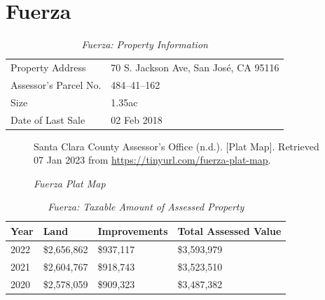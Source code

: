 
\clearpage

\section{Fuerza }\label{sec:fuerza-info}\indent

\begin{table}[htbp]
  \SingleSpacing%
  \caption[Fuerza: Property Information]{\textit{Fuerza: Property Information}}%
  \label{tab:fuerza-prop-info}
  \begin{tabular}{ll}
    \toprule
    Property Address      & 70 S. Jackson Ave, San José, CA 95116 \\
    Assessor's Parcel No. & 484–41–162 \\
    Size                  & 1.35ac \\
    Date of Last Sale     & 02 Feb 2018 \\
    \bottomrule
  \end{tabular}
\end{table}

\begin{figure}[hbtp]
  \caption[Fuerza Plat Map]{\textit{Fuerza Plat Map}}%
  \label{fig:fuerza-plat-map}
  {Santa Clara County Assessor's Office (n.d.). [Plat Map]. Retrieved 07 Jan 2023 from  \url{https://tinyurl.com/fuerza-plat-map}.}
\end{figure}

\begin{table}[hbtp]
  \SingleSpacing%
  \caption[Fuerza: Taxable Amount of Assessed Propery]{\textit{Fuerza: Taxable Amount of Assessed Property}}\label{tab:fuerza-taxable-amount}
  \begin{tabular}{llll}
    \toprule
    Year & Land        & Improvements & Total Assessed Value \\
    \midrule
    2022 & \$2,656,862 & \$937,117    & \$3,593,979 \\
    2021 & \$2,604,767 & \$918,743    & \$3,523,510 \\
    2020 & \$2,578,059 & \$909,323    & \$3,487,382 \\
    \bottomrule
  \end{tabular}
\end{table}


